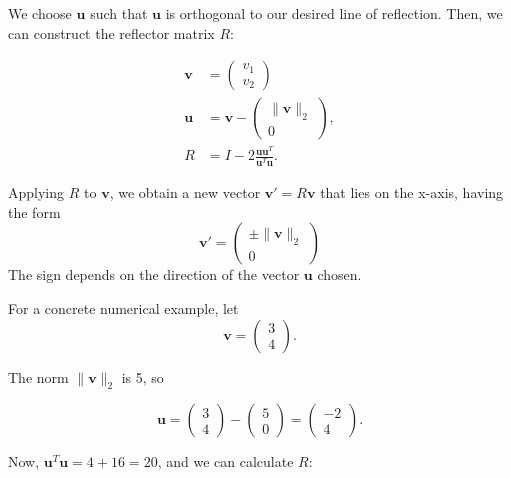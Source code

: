 We choose \( \mathbf{u} \) such that \( \mathbf{u} \) is orthogonal to our desired line of reflection. Then, we can construct the reflector matrix \( R \):

\begin{align*}
\mathbf{v} &= \begin{pmatrix} v_1 \\ v_2 \end{pmatrix} \\
\mathbf{u} &= \mathbf{v} - \begin{pmatrix} \| \mathbf{v} \|_2 \\ 0 \end{pmatrix}, \\
R &= I - 2\frac{\mathbf{u}\mathbf{u}^T}{\mathbf{u}^T\mathbf{u}}.
\end{align*}

Applying \( R \) to \( \mathbf{v} \), we obtain a new vector \( \mathbf{v}' = R\mathbf{v} \)
that lies on the x-axis, having the form
$$ \mathbf{v}' = \begin{pmatrix} \pm \| \mathbf{v} \|_2 \\ 0 \end{pmatrix} $$
The sign depends on the direction of the vector \( \mathbf{u} \) chosen.

For a concrete numerical example, let
\begin{equation*}
\mathbf{v} = \begin{pmatrix} 3 \\ 4 \end{pmatrix}.
\end{equation*}

The norm \( \| \mathbf{v} \|_2 \) is 5, so

\begin{equation*}
\mathbf{u} = \begin{pmatrix} 3 \\ 4 \end{pmatrix} - \begin{pmatrix} 5 \\ 0 \end{pmatrix} = \begin{pmatrix} -2 \\ 4 \end{pmatrix}.
\end{equation*}

Now, \( \mathbf{u}^T\mathbf{u} = 4 + 16 = 20 \), and we can calculate \( R \):

